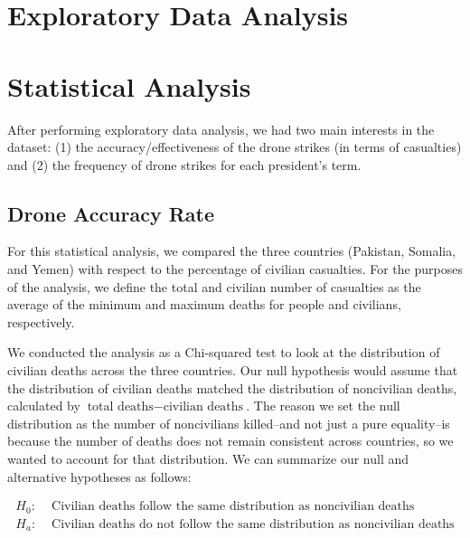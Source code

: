 \documentclass[
]{article}
\begin{document}
\hypertarget{exploratory-data-analysis}{%
\section{Exploratory Data Analysis}\label{exploratory-data-analysis}}

\hypertarget{statistical-analysis}{%
\section{Statistical Analysis}\label{statistical-analysis}}

After performing exploratory data analysis, we had two main interests in
the dataset: (1) the accuracy/effectiveness of the drone strikes (in
terms of casualties) and (2) the frequency of drone strikes for each
president's term.

\hypertarget{drone-accuracy-rate}{%
\subsection{Drone Accuracy Rate}\label{drone-accuracy-rate}}

For this statistical analysis, we compared the three countries
(Pakistan, Somalia, and Yemen) with respect to the percentage of
civilian casualties. For the purposes of the analysis, we define the
total and civilian number of casualties as the average of the minimum
and maximum deaths for people and civilians, respectively.

We conducted the analysis as a Chi-squared test to look at the
distribution of civilian deaths across the three countries. Our null
hypothesis would assume that the distribution of civilian deaths matched
the distribution of noncivilian deaths, calculated by
\(\text{total deaths} - \text{civilian deaths}\). The reason we set the
null distribution as the number of noncivilians killed--and not just a
pure equality--is because the number of deaths does not remain
consistent across countries, so we wanted to account for that
distribution. We can summarize our null and alternative hypotheses as
follows:

\[
\begin{aligned}
H_0: & \text{ Civilian deaths follow the same distribution as noncivilian deaths}\\
H_a: & \text{ Civilian deaths do not follow the same distribution as noncivilian deaths}\\
\end{aligned}
\]
\end{document}
